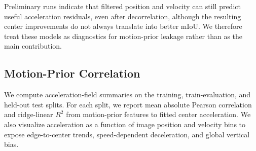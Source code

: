 \begin{table}[t]
  \centering
  \caption{Non-image forecasting baselines and linear residual diagnostics. Lower is better for ADE/FDE; higher is better for mIoU.}
  \label{tab:linear-diagnostics}
\end{table}

Preliminary runs indicate that filtered position and velocity can still predict useful acceleration residuals, even after decorrelation, although the resulting center improvements do not always translate into better mIoU. We therefore treat these models as diagnostics for motion-prior leakage rather than as the main contribution.

\subsection{Motion-Prior Correlation}

We compute acceleration-field summaries on the training, train-evaluation, and held-out test splits. For each split, we report mean absolute Pearson correlation and ridge-linear $R^2$ from motion-prior features to fitted center acceleration. We also visualize acceleration as a function of image position and velocity bins to expose edge-to-center trends, speed-dependent deceleration, and global vertical bias.

